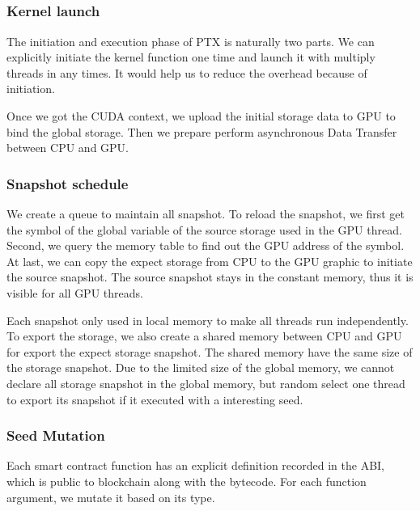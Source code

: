 \subsection{{\runner}}

\subsubsection{Kernel launch}
The initiation and execution phase of PTX is naturally two parts. We can explicitly initiate the kernel function one time and launch it with multiply threads in any times. It would help us to reduce the overhead because of initiation\cite{cudaoverhead}.

Once we got the CUDA context, we upload the initial storage data to GPU to bind the global storage. Then we prepare perform asynchronous Data Transfer between CPU and GPU. 


\subsubsection{Snapshot schedule}
We create a queue to maintain all snapshot. To reload the snapshot, we first get the symbol of the global variable of the source storage used in the GPU thread. Second, we query the memory table to find out the GPU address of the symbol. At last, we can copy the expect storage from CPU to the GPU graphic to initiate the source snapshot. The source snapshot stays in the constant memory, thus it is visible for all GPU threads. 

Each snapshot only used in local memory to make all threads run independently. To export the storage, we also create a shared memory between CPU and GPU for export the expect storage snapshot. The shared memory have the same size of the storage snapshot. Due to the limited size of the global memory, we cannot declare all storage snapshot in the global memory, but random select one thread to export its snapshot if it executed with a interesting seed.

\subsubsection{Seed Mutation}
Each smart contract function has an explicit definition recorded in the ABI, which is public to blockchain along with the bytecode.
For each function argument, we mutate it based on its type. 